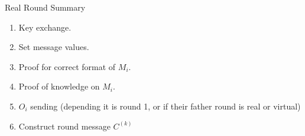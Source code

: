\begin{frame}{Real Round Summary}
    \begin{enumerate}
        \item Key exchange.
        \item Set message values.
        \item Proof for correct format of $M_i$.
        \item Proof of knowledge on $M_i$.
        \item $O_i$ sending (depending it is round 1, or if their father round is real or virtual)
        \item Construct round message $C^{(k)}$
    \end{enumerate}
\end{frame}
